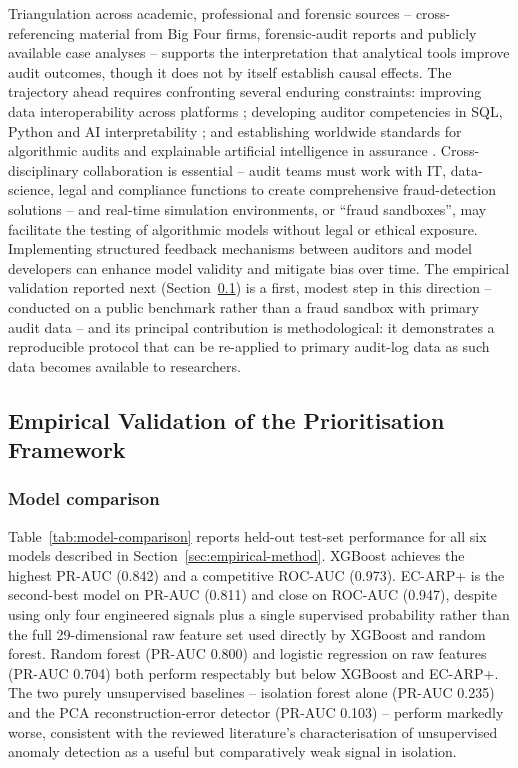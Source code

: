 \documentclass[preprint,12pt]{elsarticle}
\begin{document}
Triangulation across academic, professional and forensic sources -- cross-referencing material from Big Four firms, forensic-audit reports and publicly available case analyses -- supports the interpretation that analytical tools improve audit outcomes, though it does not by itself establish causal effects. The trajectory ahead requires confronting several enduring constraints: improving data interoperability across platforms \citep{mai2022}; developing auditor competencies in SQL, Python and AI interpretability \citep{george2022}; and establishing worldwide standards for algorithmic audits and explainable artificial intelligence in assurance \citep{akula2021}. Cross-disciplinary collaboration is essential -- audit teams must work with IT, data-science, legal and compliance functions to create comprehensive fraud-detection solutions -- and real-time simulation environments, or ``fraud sandboxes'', may facilitate the testing of algorithmic models without legal or ethical exposure. Implementing structured feedback mechanisms between auditors and model developers can enhance model validity and mitigate bias over time. The empirical validation reported next (Section~\ref{sec:empirical-results}) is a first, modest step in this direction -- conducted on a public benchmark rather than a fraud sandbox with primary audit data -- and its principal contribution is methodological: it demonstrates a reproducible protocol that can be re-applied to primary audit-log data as such data becomes available to researchers.

\subsection{Empirical Validation of the Prioritisation Framework}
\label{sec:empirical-results}

\subsubsection{Model comparison}

Table~\ref{tab:model-comparison} reports held-out test-set performance for all six models described in Section~\ref{sec:empirical-method}. XGBoost achieves the highest PR-AUC (0.842) and a competitive ROC-AUC (0.973). EC-ARP+ is the second-best model on PR-AUC (0.811) and close on ROC-AUC (0.947), despite using only four engineered signals plus a single supervised probability rather than the full 29-dimensional raw feature set used directly by XGBoost and random forest. Random forest (PR-AUC 0.800) and logistic regression on raw features (PR-AUC 0.704) both perform respectably but below XGBoost and EC-ARP+. The two purely unsupervised baselines -- isolation forest alone (PR-AUC 0.235) and the PCA reconstruction-error detector (PR-AUC 0.103) -- perform markedly worse, consistent with the reviewed literature's characterisation of unsupervised anomaly detection as a useful but comparatively weak signal in isolation.
\end{document}
